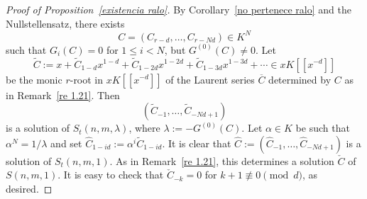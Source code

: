 \documentclass[reqno,a4paper]{amsart}
\theoremstyle{definition}
\theoremstyle{remark}
\newcommand{\ov}{\overline}
\begin{document}
\begin{proof}[Proof of Proposition~\ref{existencia ralo}] By Corollary~\ref{no pertenece ralo} and the Nullstellensatz,
there exists
$$
C=(C_{r-d},\dots,C_{r-Nd})\in K^N
$$
such that $G_i(C) = 0$ for $1\le i< N$, but $G^{(0)}(C)\ne 0$. Let
$$
\tilde C:= x + \tilde C_{1-d}x^{1-d}+ \tilde C_{1-2d}x^{1-2d}+ \tilde C_{1-3d}x^{1-3d}+\cdots \in x K[[x^{-d}]]
$$
be the monic $r$-root in $x K[[x^{-d}]]$ of the Laurent series $\ov{C}$ determined by $C$ as in Remark~\ref{re 1.21}. Then
$$
(\tilde C_{-1},\dots, \tilde C_{-Nd+1})
$$
is a solution of $S_t(n,m,\lambda)$, where $\lambda:=-G^{(0)}(C)$. Let $\alpha\in K$ be such that $\alpha^{N}=1/\lambda$
and set $\hat C_{1-id}:=\alpha^{i} \tilde C_{1-id}$. It is clear that $\hat C:=(\hat C_{-1},\dots,\hat C_{-Nd+1})$ is a solution
of $S_t(n,m,1)$. As in Remark~\ref{re 1.21}, this determines a solution
$\check{C}$ of $S(n,m,1)$. It is easy to check that $\check{C}_{-k}=0$ for $k+1\not\equiv 0 \pmod d$, as desired.
\end{proof}
\end{document}
